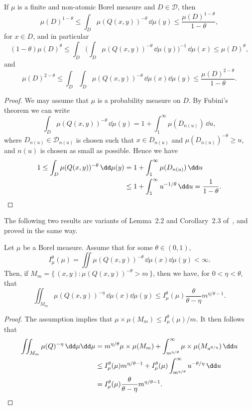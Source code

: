\begin{lemm}\label{lem:energyestimate}
If $\mu$ is a finite and non-atomic Borel measure and $D\in
\mathscr{D}$, then
\[
\mu(D)^{1-\theta} \leq \int_D \mu (Q(x,y))^{-\theta} \, \dd
\mu (y) \leq \frac{\mu(D)^{1 - \theta}}{1 - \theta},
\]
for $x \in D$, and in particular
\[
(1 - \theta) \mu (D)^\theta \leq \int_D \biggl(\int_D \mu (Q(x,y))^{-\theta} \, \dd \mu (y) \biggr)^{-1} \, \dd
\mu (x) \leq \mu (D)^\theta,
\]
and
\[
\mu(D)^{2-\theta} \leq \int_D \int_D \mu(Q(x,y))^{-\theta} \,
\dd \mu(x) \dd \mu (y) \leq \frac{\mu(D)^{2-\theta}}{1 - \theta}.
\]
\end{lemm}

\begin{proof}
We may assume that $\mu$ is a probability measure on $D$. By Fubini's theorem we can write
\[
\int_D \mu (Q(x,y))^{-\theta} \, \dd \mu (y) = 1 +
\int_1^\infty \mu (D_{n(u)}) \, \dd u,
\]
where $D_{n(u)} \in \mathscr{D}_{n(u)}$ is chosen such that $x \in D_{n(u)}$ and $\mu (D_{n(u)})^{-\theta} \geq u$, and $n (u)$ is chosen as small as possible. Hence we have
\begin{align*}
1 \leq \int_D \mu (Q(x,y))^{-\theta} \, \dd \mu (y) &= 1 +
\int_1^\infty \mu (D_{n(u)}) \, \dd u \\ &\leq 1 +
\int_1^\infty u^{-1/\theta} \, \dd u = \frac{1}{1 -
\theta}. \qedhere
\end{align*}
\end{proof}

The following two results are variants of Lemma~2.2 and Corollary~2.3 of~\cite{perssonreeve}, and proved in the same way.

\begin{lemm}\label{lem:Mm}
Let $\mu$ be a Borel measure. Assume that for some $\theta \in (0,1)$,
\[
I_\mu^\theta (\mu) = \iint \mu (Q(x,y))^{-\theta} \,
\dd\mu (x) \dd \mu (y) < \infty.
\]
Then, if $M_m = \{\, (x,y) : \mu (Q(x,y))^{-\theta} > m \,\}$, then we have, for $0 < \eta < \theta$, that
\[
\iint_{M_m} \mu (Q(x,y))^{-\eta} \, \dd \mu (x) \dd
\mu (y) \leq I_\mu^\theta (\mu) \frac{\theta}{\theta - \eta} m^{\eta/\theta - 1}.
\]
\end{lemm}

\begin{proof}
The assumption implies that $\mu \times \mu (M_m) \leq I_\mu^\theta (\mu) /m$. It then follows that
\begin{align*}
\iint_{M_m} \mu (Q)^{-\eta} \, \dd\mu \dd \mu & = m^{\eta/\theta} \mu \times \mu (M_m) +
\int_{m^{\eta/\theta}}^\infty \mu \times \mu (M_{u^{\theta/\eta}})
\, \dd u \\ &\leq I_\mu^\theta (\mu) m^{\eta/\theta - 1} + I_\mu^\theta (\mu) \int_{m^{\eta/\theta}}^\infty u^{-\theta/\eta}
\, \dd u \\ &= I_\mu^\theta (\mu) \frac{\theta}{\theta -
\eta} m^{\eta/\theta - 1}. \qedhere
\end{align*}
\end{proof}

